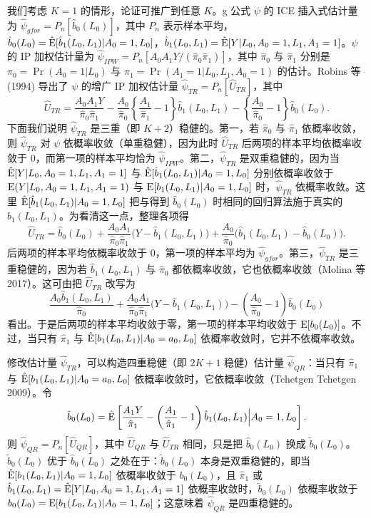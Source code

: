 \begin{techpoint}
我们考虑 $K=1$ 的情形，论证可推广到任意 $K$。g 公式 $\psi$ 的 ICE 插入式估计量为 $\hat\psi_{gfor}=P_n[\hat b_0(L_0)]$，其中 $P_n$ 表示样本平均，$\hat b_0(L_0)=\hat{\mathrm{E}}[\hat b_1(L_0,L_1)|A_0=1,L_0]$，$\hat b_1(L_0,L_1)=\hat{\mathrm{E}}[Y|L_0,A_0=1,L_1,A_1=1]$。$\psi$ 的 IP 加权估计量为 $\hat\psi_{IPW}=P_n[A_0A_1Y/(\hat\pi_0\hat\pi_1)]$，其中 $\hat\pi_0$ 与 $\hat\pi_1$ 分别是 $\pi_0=\Pr(A_0=1|L_0)$ 与 $\pi_1=\Pr(A_1=1|L_0,L_1,A_0=1)$ 的估计。Robins 等 (1994) 导出了 $\psi$ 的增广 IP 加权估计量 $\hat\psi_{TR}=P_n[\hat U_{TR}]$，其中
\[
\hat U_{TR}=\frac{A_0A_1Y}{\hat\pi_0\hat\pi_1}-\frac{A_0}{\hat\pi_0}\left\{\frac{A_1}{\hat\pi_1}-1\right\}\hat b_1(L_0,L_1)-\left\{\frac{A_0}{\hat\pi_0}-1\right\}\hat b_0(L_0).
\]
下面我们说明 $\hat\psi_{TR}$ 是三重（即 $K+2$）稳健的。第一，若 $\hat\pi_0$ 与 $\hat\pi_1$ 依概率收敛，则 $\hat\psi_{TR}$ 对 $\psi$ 依概率收敛（单重稳健），因为此时 $\hat U_{TR}$ 后两项的样本平均依概率收敛于 0，而第一项的样本平均恰为 $\hat\psi_{IPW}$。第二，$\hat\psi_{TR}$ 是双重稳健的，因为当 $\hat{\mathrm{E}}[Y|L_0,A_0=1,L_1,A_1=1]$ 与 $\hat{\mathrm{E}}[\hat b_1(L_0,L_1)|A_0=1,L_0]$ 分别依概率收敛于 $\mathrm{E}(Y|L_0,A_0=1,L_1,A_1=1)$ 与 $\mathrm{E}[b_1(L_0,L_1)|A_0=1,L_0]$ 时，$\hat\psi_{TR}$ 依概率收敛。这里 $\hat{\mathrm{E}}[\hat b_1(L_0,L_1)|A_0=1,L_0]$ 把与得到 $\hat b_0(L_0)$ 时相同的回归算法施于真实的 $b_1(L_0,L_1)$。为看清这一点，整理各项得
\[
\hat U_{TR}=\hat b_0(L_0)+\frac{A_0A_1}{\hat\pi_0\hat\pi_1}\big(Y-\hat b_1(L_0,L_1)\big)+\frac{A_0}{\hat\pi_0}\big(\hat b_1(L_0,L_1)-\hat b_0(L_0)\big).
\]
后两项的样本平均依概率收敛于 0，第一项的样本平均为 $\hat\psi_{gfor}$。第三，$\hat\psi_{TR}$ 是三重稳健的，因为若 $\hat b_1(L_0,L_1)$ 与 $\hat\pi_0$ 都依概率收敛，它也依概率收敛（Molina 等 2017）。这可由把 $\hat U_{TR}$ 改写为
\[
\frac{A_0\hat b_1(L_0,L_1)}{\hat\pi_0}+\frac{A_0A_1}{\hat\pi_0\hat\pi_1}\big(Y-\hat b_1(L_0,L_1)\big)-\left(\frac{A_0}{\hat\pi_0}-1\right)\hat b_0(L_0)
\]
看出。于是后两项的样本平均收敛于零，第一项的样本平均收敛于 $\mathrm{E}[b_0(L_0)]$。不过，当只有 $\hat\pi_1$ 与 $\hat{\mathrm{E}}[b_1(L_0,L_1)|A_0=a_0,L_0]$ 依概率收敛时，它并不依概率收敛。

修改估计量 $\hat\psi_{TR}$，可以构造四重稳健（即 $2K+1$ 稳健）估计量 $\hat\psi_{QR}$：当只有 $\hat\pi_1$ 与 $\hat{\mathrm{E}}[b_1(L_0,L_1)|A_0=a_0,L_0]$ 依概率收敛时，它依概率收敛（Tchetgen Tchetgen 2009）。令
\[
\tilde b_0(L_0)=\hat{\mathrm{E}}\left[\frac{A_1Y}{\hat\pi_1}-\left(\frac{A_1}{\hat\pi_1}-1\right)\hat b_1(L_0,L_1)\Big|A_0=1,L_0\right].
\]
则 $\hat\psi_{QR}=P_n[\hat U_{QR}]$，其中 $\hat U_{QR}$ 与 $\hat U_{TR}$ 相同，只是把 $\hat b_0(L_0)$ 换成 $\tilde b_0(L_0)$。$\tilde b_0(L_0)$ 优于 $\hat b_0(L_0)$ 之处在于：$\tilde b_0(L_0)$ 本身是双重稳健的，即当 $\hat{\mathrm{E}}[b_1(L_0,L_1)|A_0=1,L_0]$ 依概率收敛于 $b_0(L_0)$，且 $\hat\pi_1$ 或 $\hat b_1(L_0,L_1)=\hat{\mathrm{E}}[Y|L_0,A_0=1,L_1,A_1=1]$ 依概率收敛时，$\tilde b_0(L_0)$ 依概率收敛于 $b_0(L_0)=\mathrm{E}[b_1(L_0,L_1)|A_0=1,L_0]$；这意味着 $\hat\psi_{QR}$ 是四重稳健的。
\end{techpoint}

